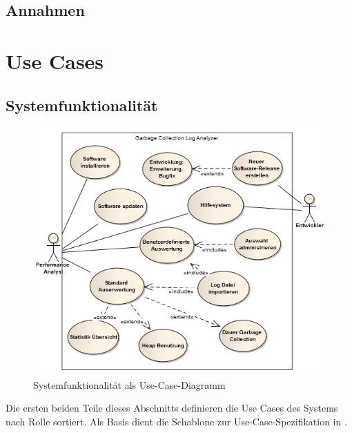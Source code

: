 \subsection{Annahmen}


\section{Use Cases}\label{use_cases}
\subsection{Systemfunktionalität}\label{systemfunktionalitaet}
 \begin{figure}[H]
  	\centering
        	\caption{Systemfunktionalität als Use-Case-Diagramm}
    	\includegraphics[width=15cm]{images/anforderungen_use-case}
\end{figure}
Die ersten beiden Teile dieses Abschnitts definieren die Use Cases des Systems nach Rolle sortiert. Als Basis dient die Schablone zur Use-Case-Spezifikation in \cite[S. 78-79]{pohl2010basiswissen}.






